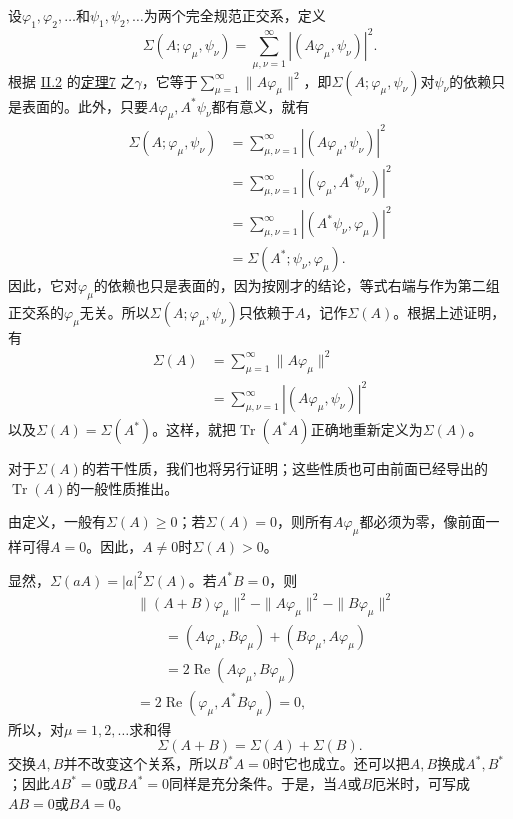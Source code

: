 \documentclass[fontsize=13pt,twoside,openany,headings=normal,parskip=false,bookmarkpackage=false,DIV=calc]{scrbook}
\begin{document}
设$\varphi_1,\allowbreak \varphi_2,\allowbreak \ldots$和$\psi_1,\allowbreak \psi_2,\allowbreak \ldots$为两个完全规范正交系，定义
\[
\Sigma(A;\varphi_\mu,\psi_\nu)
=\sum_{\mu,\nu=1}^{\infty}|(A\varphi_\mu,\psi_\nu)|^2.
\]
根据 \hyperref[sec:II.2]{II.2} 的\CJKglue \hyperref[thm:II.7]{定理7} 之$\gamma$，它等于$\sum_{\mu=1}^{\infty}\|A\varphi_\mu\|^2$，即$\Sigma(A;\varphi_\mu,\allowbreak \psi_\nu)$对$\psi_\nu$的依赖只是表面的。此外，只要$A\varphi_\mu,\allowbreak A^*\psi_\nu$都有意义，就有
\begin{align*}
\Sigma(A;\varphi_\mu,\psi_\nu)
&=\sum_{\mu,\nu=1}^{\infty}|(A\varphi_\mu,\psi_\nu)|^2\\
&=\sum_{\mu,\nu=1}^{\infty}|(\varphi_\mu,A^*\psi_\nu)|^2\\
&=\sum_{\mu,\nu=1}^{\infty}|(A^*\psi_\nu,\varphi_\mu)|^2\\
&=\Sigma(A^*;\psi_\nu,\varphi_\mu).
\end{align*}
因此，它对$\varphi_\mu$的依赖也只是表面的，因为按刚才的结论，等式右端与作为第二组正交系的$\varphi_\mu$无关。所以$\Sigma(A;\varphi_\mu,\allowbreak \psi_\nu)$只依赖于$A$，记作$\Sigma(A)$。根据上述证明，有
\begin{align*}
\Sigma(A)&=\sum_{\mu=1}^{\infty}\|A\varphi_\mu\|^2\\
&=\sum_{\mu,\nu=1}^{\infty}|(A\varphi_\mu,\psi_\nu)|^2
\end{align*}
以及$\Sigma(A)=\Sigma(A^*)$。这样，就把$\operatorname{Tr}(A^*A)$正确地重新定义为$\Sigma(A)$。

对于$\Sigma(A)$的若干性质，我们也将另行证明；这些性质也可由前面已经导出的$\operatorname{Tr}(A)$的一般性质推出。

由定义，一般有$\Sigma(A)\geq0$；若$\Sigma(A)=0$，则所有$A\varphi_\mu$都必须为零，像前面一样可得$A=0$。因此，$A\ne0$时$\Sigma(A)>0$。

显然，$\Sigma(aA)=|a|^2\Sigma(A)$。若$A^*B=0$，则
\begin{align*}
&\|(A+B)\varphi_\mu\|^2-\|A\varphi_\mu\|^2-\|B\varphi_\mu\|^2\\
&\qquad=(A\varphi_\mu,B\varphi_\mu)+(B\varphi_\mu,A\varphi_\mu)\\
&\qquad=2\operatorname{Re}(A\varphi_\mu,B\varphi_\mu)\\
&=2\operatorname{Re}(\varphi_\mu,A^*B\varphi_\mu)=0,
\end{align*}
所以，对$\mu=1,\allowbreak 2,\allowbreak \ldots$求和得
\[
\Sigma(A+B)=\Sigma(A)+\Sigma(B).
\]
交换$A,\allowbreak B$并不改变这个关系，所以$B^*A=0$时它也成立。还可以把$A,\allowbreak B$换成$A^*,\allowbreak B^*$；因此$AB^*=0$或$BA^*=0$同样是充分条件。于是，当$A$或$B$厄米时，可写成$AB=0$或$BA=0$。
\end{document}
